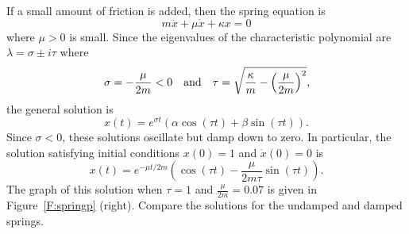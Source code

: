 \documentclass{ximera}
\begin{document}
If a small amount of friction is added, then the spring equation is
\[
m\ddot{x} + \mu \dot{x} +\kappa x = 0
\]
where $\mu>0$ is small.  Since the eigenvalues of the characteristic
polynomial are $\lambda=\sigma\pm i\tau$ where
\[
\sigma = -\frac{\mu}{2m} < 0 \quad\mbox{and}\quad \tau =\sqrt{\frac{\kappa}{m}
-\left(\frac{\mu}{2m}\right)^2},
\]
the general solution is
\[
x(t) = e^{\sigma t}(\alpha\cos(\tau t) + \beta\sin(\tau t)).
\]
Since $\sigma<0$, these solutions oscillate but damp down to zero.  In
particular, the solution satisfying initial conditions $x(0)=1$ and
$\dot{x}(0)=0$ is
\[
x(t) = e^{-\mu t/2m}
\left(\cos(\tau t)-\frac{\mu}{2m\tau}\sin(\tau t)\right).
\]
The graph of this solution when $\tau=1$ and $\frac{\mu}{2m}=0.07$ is
given in Figure~\ref{F:springp} (right).  Compare the solutions for the
undamped and damped springs.

\EXER

\end{document}
